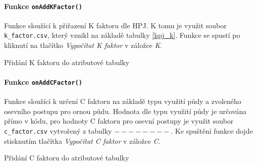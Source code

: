 \paragraph{Funkce \texttt{onAddKFactor()}} Funkce sloužící k přiřazení
K faktoru dle HPJ. K tomu je využit soubor \texttt{k\_factor.csv},
který vznikl na základě tabulky \ref{hpj_k}. Funkce se spustí po
kliknutí na tlačítko \textit{Vypočítat K faktor} v záložce \textit{K}.
\begin{algorithm}
\caption{Přidání K faktoru do atributové tabulky}
\label{alg:onAddKFactor}
    \begin{algorithmic}[1] 
 
 
    	\ENDIF {} 
 \ELSE {}
    		\ENDIF
    	\ENDFOR {}
    \end{algorithmic}
\end{algorithm}

\paragraph{Funkce \texttt{onAddCFactor()}} Funkce sloužící k určení C
faktoru na základě typu využití půdy a zvoleného osevního postupu pro
ornou půdu. Hodnota dle typu využití půdy je určována přímo v kódu,
pro hodnoty C faktoru pro osevní postupy je využit soubor
\texttt{c\_factor.csv} vytvořený z tabulky $--------$. Ke spuštění
funkce dojde stisknutím tlačítka \textit{Vypočítat C faktor} v záložce
\textit{C}.
\begin{algorithm}
\caption{Přidání C faktoru do atributové tabulky}
\label{alg:onAddKFactor}
    \begin{algorithmic}[1] 
  
 
      	\ENDIF {}  
 
    		\ENDIF
    	\ENDFOR {}
    \end{algorithmic}
\end{algorithm} \FloatBarrier
